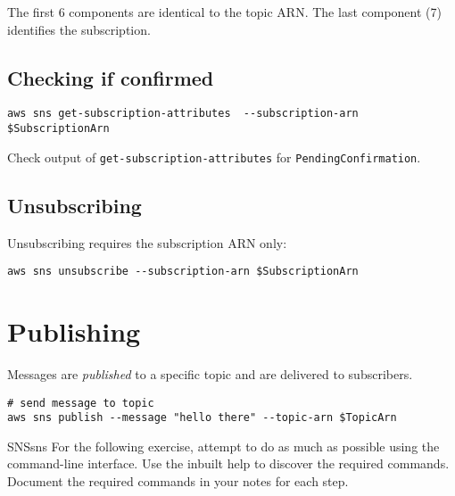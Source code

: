 \documentclass{pgnotes}
\begin{document}
The first 6 components are identical to the topic ARN. The last
component (7) identifies the subscription.

\subsection{Checking if confirmed}\label{checking-if-confirmed}

\begin{verbatim}
aws sns get-subscription-attributes  --subscription-arn $SubscriptionArn
\end{verbatim}

Check output of \texttt{get-subscription-attributes} for
\texttt{PendingConfirmation}.

\subsection{Unsubscribing}\label{unsubscribing}

Unsubscribing requires the subscription ARN only:

\begin{verbatim}
aws sns unsubscribe --subscription-arn $SubscriptionArn
\end{verbatim}

\section{Publishing}\label{publishing}

Messages are \emph{published} to a specific topic and are delivered to
subscribers.

\begin{verbatim}
# send message to topic 
aws sns publish --message "hello there" --topic-arn $TopicArn
\end{verbatim}

{SNS}{sns} For the following exercise, attempt to do as much as possible
using the command-line interface. Use the inbuilt help to discover the
required commands. Document the required commands in your notes for each
step.
\end{document}
